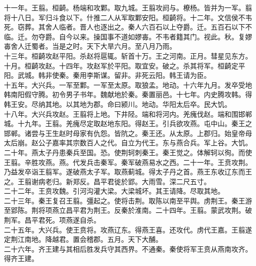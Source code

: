 \documentclass{zhvt-classic}
\begin{document}
\hspace*{2em}十一年。王翦。桓齮。杨端和攻鄴。取九城。王翦攻阏与。橑杨。皆并为一军。翦将十八日。军归斗食以下。什推二人从军取鄴安阳。桓齮将。十二年。文信侯不韦死。窃葬。其舍人临者。晋人也逐出之。秦人六百石以上夺爵。迁。五百石以下不临。迁。勿夺爵。自今以来。操国事不道如嫪毐。不韦者籍其门。视此。秋。复嫪毐舍人迁蜀者。当是之时。天下大旱六月。至八月乃雨。\\
\hspace*{2em}十三年。桓齮攻赵平阳。杀赵将扈辄。斩首十万。王之河南。正月。彗星见东方。十月。桓齮攻赵。十四年。攻赵军於平阳。取宜安。破之。杀其将军。桓齮定平阳。武城。韩非使秦。秦用李斯谋。留非。非死云阳。韩王请为臣。\\
\hspace*{2em}十五年。大兴兵。一军至鄴。一军至太原。取狼孟。地动。十六年九月。发卒受地韩南阳假守腾。初令男子书年。魏献地於秦。秦置丽邑。十七年。内史腾攻韩。得韩王安。尽纳其地。以其地为郡。命曰颍川。地动。华阳太后卒。民大饥。\\
\hspace*{2em}十八年。大兴兵攻赵。王翦将上地。下井陉。端和将河内。羌瘣伐赵。端和围邯郸城。十九年。王翦。羌瘣尽定取赵地东阳。得赵王。引兵欲攻燕。屯中山。秦王之邯郸。诸尝与王生赵时母家有仇怨。皆阬之。秦王还。从太原。上郡归。始皇帝母太后崩。赵公子嘉率其宗数百人之代。自立为代王。东与燕合兵。军上谷。大饥。\\
\hspace*{2em}二十年。燕太子丹患秦兵至国。恐。使荆轲刺秦王。秦王觉之。体解轲以徇。而使王翦。辛胜攻燕。燕。代发兵击秦军。秦军破燕易水之西。二十一年。王贲攻荆。乃益发卒诣王翦军。遂破燕太子军。取燕蓟城。得太子丹之首。燕王东收辽东而王之。王翦谢病老归。新郑反。昌平君徙於郢。大雨雪。深二尺五寸。\\
\hspace*{2em}二十二年。王贲攻魏。引河沟灌大梁。大梁城坏。其王请降。尽取其地。\\
\hspace*{2em}二十三年。秦王复召王翦。彊起之。使将击荆。取陈以南至平舆。虏荆王。秦王游至郢陈。荆将项燕立昌平君为荆王。反秦於淮南。二十四年。王翦。蒙武攻荆。破荆军。昌平君死。项燕遂自杀。\\
\hspace*{2em}二十五年。大兴兵。使王贲将。攻燕辽东。得燕王喜。还攻代。虏代王嘉。王翦遂定荆江南地。降越君。置会稽郡。五月。天下大酺。\\
\hspace*{2em}二十六年。齐王建与其相后胜发兵守其西界。不通秦。秦使将军王贲从燕南攻齐。得齐王建。\\
\end{document}
